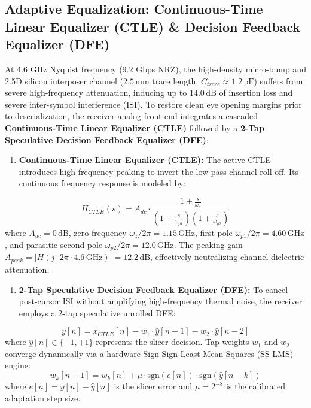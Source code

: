 \documentclass[journal,10pt,twocolumn]{IEEEtran}
\begin{document}
\subsection{Adaptive Equalization: Continuous-Time Linear Equalizer (CTLE) \& Decision Feedback Equalizer (DFE)}

At 4.6 GHz Nyquist frequency (9.2 Gbps NRZ), the high-density micro-bump and 2.5D silicon interposer channel ($2.5\,\text{mm}$ trace length, $C_{trace} \approx 1.2\,\text{pF}$) suffers from severe high-frequency attenuation, inducing up to $14.0\,\text{dB}$ of insertion loss and severe inter-symbol interference (ISI). To restore clean eye opening margins prior to deserialization, the receiver analog front-end integrates a cascaded \textbf{Continuous-Time Linear Equalizer (CTLE)} followed by a \textbf{2-Tap Speculative Decision Feedback Equalizer (DFE)}:

\begin{enumerate}
  \item \textbf{Continuous-Time Linear Equalizer (CTLE):} The active CTLE introduces high-frequency peaking to invert the low-pass channel roll-off. Its continuous frequency response is modeled by:
\end{enumerate}
$$H_{CTLE}(s) = A_{dc} \cdot \frac{1 + \frac{s}{\omega_z}}{\left(1 + \frac{s}{\omega_{p1}}\right)\left(1 + \frac{s}{\omega_{p2}}\right)}$$
where $A_{dc} = 0\,\text{dB}$, zero frequency $\omega_z / 2\pi = 1.15\,\text{GHz}$, first pole $\omega_{p1} / 2\pi = 4.60\,\text{GHz}$, and parasitic second pole $\omega_{p2} / 2\pi = 12.0\,\text{GHz}$. The peaking gain $A_{peak} = |H(j \cdot 2\pi \cdot 4.6\,\text{GHz})| = 12.2\,\text{dB}$, effectively neutralizing channel dielectric attenuation.

\begin{enumerate}
  \item \textbf{2-Tap Speculative Decision Feedback Equalizer (DFE):} To cancel post-cursor ISI without amplifying high-frequency thermal noise, the receiver employs a 2-tap speculative unrolled DFE:
\end{enumerate}
$$y[n] = x_{CTLE}[n] - w_1 \cdot \hat{y}[n-1] - w_2 \cdot \hat{y}[n-2]$$
where $\hat{y}[n] \in \{-1, +1\}$ represents the slicer decision. Tap weights $w_1$ and $w_2$ converge dynamically via a hardware Sign-Sign Least Mean Squares (SS-LMS) engine:
$$w_k[n+1] = w_k[n] + \mu \cdot \text{sgn}(e[n]) \cdot \text{sgn}(\hat{y}[n-k])$$
where $e[n] = y[n] - \hat{y}[n]$ is the slicer error and $\mu = 2^{-8}$ is the calibrated adaptation step size.
\end{document}
